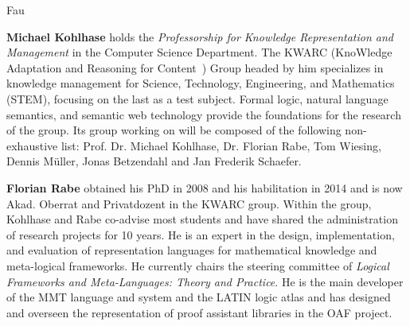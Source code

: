 \begin{sitedescription}{Fau}
\begin{compactitem}
\item\textbf{Michael Kohlhase} holds the \emph{Professorship for Knowledge Representation and Management} in the Computer Science Department.
The KWARC (KnoWledge Adaptation and Reasoning for Content~\cite{KWARC:online}) Group headed by him specializes in knowledge management for Science, Technology, Engineering, and Mathematics (STEM), focusing on the last as a test subject.
Formal logic, natural language semantics, and semantic web technology provide the foundations for the research of the group.
Its group working on \pn will be composed of the following non-exhaustive list: Prof. Dr. Michael Kohlhase, Dr. Florian Rabe, Tom Wiesing, Dennis M\"uller, Jonas Betzendahl and Jan Frederik Schaefer.

\item\textbf{Florian Rabe} obtained his PhD in 2008 and his habilitation in 2014 and is now Akad. Oberrat and Privatdozent in the KWARC group.
Within the group, Kohlhase and Rabe co-advise most students and have shared the administration of research projects for 10 years.
He is an expert in the design, implementation, and evaluation of representation languages for mathematical knowledge and meta-logical frameworks.
He currently chairs the steering committee of \emph{Logical Frameworks and Meta-Languages: Theory and Practice}.
He is the main developer of the MMT language and system and the LATIN logic atlas and has designed and overseen the representation of proof assistant libraries in the OAF project.
\end{compactitem}

\end{sitedescription}

